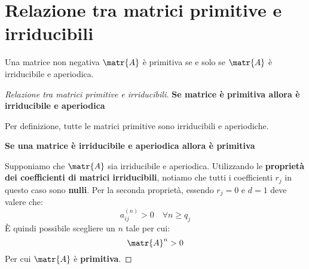 \documentclass[\main/main.tex]{subfiles}
\begin{document}
\section{Relazione tra matrici primitive e irriducibili}
\begin{theorem}
  Una matrice non negativa \(\matr{A}\) è primitiva se e solo se \(\matr{A}\) è irriducibile e aperiodica.
\end{theorem}
\begin{proof}[Relazione tra matrici primitive e irriducibili]

  \textbf{Se matrice è primitiva allora è irriducibile e aperiodica}

  Per definizione, tutte le matrici primitive sono irriducibili e aperiodiche.

  \textbf{Se una matrice è irriducibile e aperiodica allora è primitiva}

  Supponiamo che \(\matr{A}\) sia irriducibile e aperiodica. Utilizzando le \textbf{proprietà dei coefficienti di matrici irriducibili}, notiamo che tutti i coefficienti \(r_j\) in questo caso sono \textbf{nulli}. Per la seconda proprietà, essendo \(r_j = 0\) e \(d=1\) deve valere che:
  \[
    a_{ij}^{(n)} > 0 \quad \forall n \geq q_j
  \]
  È quindi possibile scegliere un \(n\) tale per cui:
  \[
    \matr{A}^n > 0
  \]
  Per cui \(\matr{A}\) è \textbf{primitiva}.
\end{proof}
\end{document}
